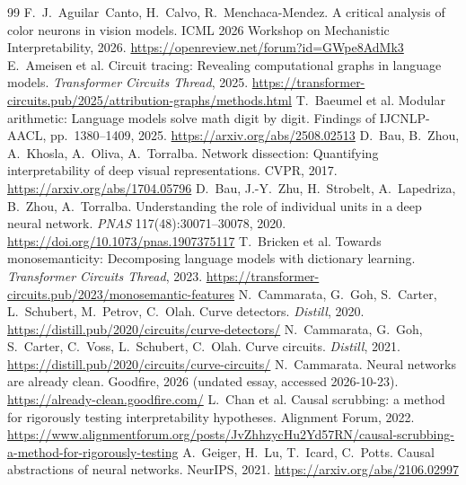 \documentclass[11pt]{article}
\begin{document}

\begin{thebibliography}{99}
 F.~J.~Aguilar~Canto, H.~Calvo, R.~Menchaca-Mendez. A critical analysis of color neurons in vision models. ICML 2026 Workshop on Mechanistic Interpretability, 2026. \url{https://openreview.net/forum?id=GWpe8AdMk3}
 E.~Ameisen et al. Circuit tracing: Revealing computational graphs in language models. \emph{Transformer Circuits Thread}, 2025. \url{https://transformer-circuits.pub/2025/attribution-graphs/methods.html}
 T.~Baeumel et al. Modular arithmetic: Language models solve math digit by digit. Findings of IJCNLP-AACL, pp.~1380--1409, 2025. \url{https://arxiv.org/abs/2508.02513}
 D.~Bau, B.~Zhou, A.~Khosla, A.~Oliva, A.~Torralba. Network dissection: Quantifying interpretability of deep visual representations. CVPR, 2017. \url{https://arxiv.org/abs/1704.05796}
 D.~Bau, J.-Y.~Zhu, H.~Strobelt, A.~Lapedriza, B.~Zhou, A.~Torralba. Understanding the role of individual units in a deep neural network. \emph{PNAS} 117(48):30071--30078, 2020. \url{https://doi.org/10.1073/pnas.1907375117}
 T.~Bricken et al. Towards monosemanticity: Decomposing language models with dictionary learning. \emph{Transformer Circuits Thread}, 2023. \url{https://transformer-circuits.pub/2023/monosemantic-features}
 N.~Cammarata, G.~Goh, S.~Carter, L.~Schubert, M.~Petrov, C.~Olah. Curve detectors. \emph{Distill}, 2020. \url{https://distill.pub/2020/circuits/curve-detectors/}
 N.~Cammarata, G.~Goh, S.~Carter, C.~Voss, L.~Schubert, C.~Olah. Curve circuits. \emph{Distill}, 2021. \url{https://distill.pub/2020/circuits/curve-circuits/}
 N.~Cammarata. Neural networks are already clean. Goodfire, 2026 (undated essay, accessed 2026-10-23). \url{https://already-clean.goodfire.com/}
 L.~Chan et al. Causal scrubbing: a method for rigorously testing interpretability hypotheses. Alignment Forum, 2022. \url{https://www.alignmentforum.org/posts/JvZhhzycHu2Yd57RN/causal-scrubbing-a-method-for-rigorously-testing}
 A.~Geiger, H.~Lu, T.~Icard, C.~Potts. Causal abstractions of neural networks. NeurIPS, 2021. \url{https://arxiv.org/abs/2106.02997}

\end{thebibliography}
\end{document}
